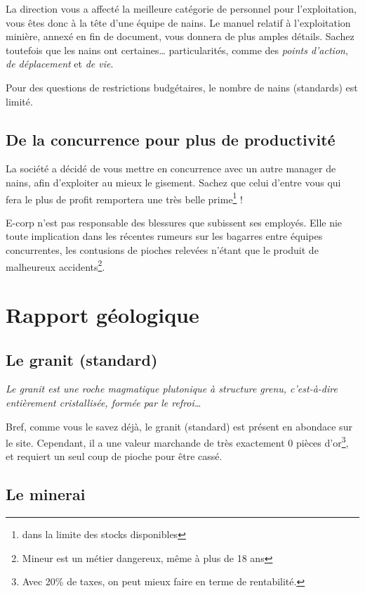   La direction vous a affecté la meilleure catégorie de personnel pour
  l'exploitation, vous êtes donc à la tête d'une équipe de nains. Le manuel
  relatif à l'exploitation minière, annexé en fin de document, vous donnera de
  plus amples détails. Sachez toutefois que les nains ont certaines\ldots{}
  particularités, comme des \textit{points d'action}, \textit{de déplacement}
  et \textit{de vie}.

  Pour des questions de restrictions budgétaires, le nombre de nains
  (standards) est limité.

\subsection{De la concurrence pour plus de productivité}

  La société a décidé de vous mettre en concurrence avec un autre manager de
  nains, afin d'exploiter au mieux le gisement. Sachez que celui d'entre vous
  qui fera le plus de profit remportera une très belle prime\footnote{dans la
  limite des stocks disponibles} !

  E-corp n'est pas responsable des blessures que subissent ses employés. Elle
  nie toute implication dans les récentes rumeurs sur les bagarres entre
  équipes concurrentes, les contusions de pioches relevées n'étant que le
  produit de malheureux accidents\footnote{Mineur est un métier dangereux,
  même à plus de 18 ans}.

\newpage

\section{Rapport géologique}

\subsection{Le granit (standard)}

  \textit{Le granit est une roche magmatique plutonique à structure grenu,
  c'est-à-dire entièrement cristallisée, formée par le refroi\ldots{}}

  Bref, comme vous le savez déjà, le granit (standard) est présent en abondace
  sur le site. Cependant, il a une valeur marchande de très exactement 0 pièces
  d'or\footnote{Avec 20\% de taxes, on peut mieux faire en terme de
  rentabilité.}, et requiert un seul coup de pioche pour être cassé.

\subsection{Le minerai}

